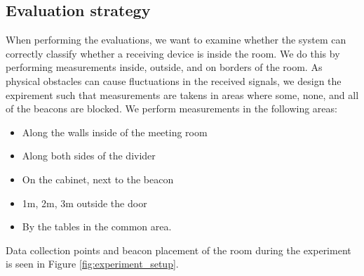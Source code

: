 \subsection{Evaluation strategy}
When performing the evaluations, we want to examine whether the system can correctly classify whether a receiving device is inside the room.
We do this by performing measurements inside, outside, and on borders of the room.
As physical obstacles can cause fluctuations in the received signals, we design the expirement such that measurements are takens in areas where some, none, and all of the beacons are blocked. 
We perform measurements in the following areas:
\begin{itemize}
    \item Along the walls inside of the meeting room
    \item Along both sides of the divider
    \item On the cabinet, next to the beacon
    \item 1m, 2m, 3m outside the door
    \item By the tables in the common area. 
\end{itemize}
Data collection points and beacon placement of the room during the experiment is seen in Figure \ref{fig:experiment_setup}.
